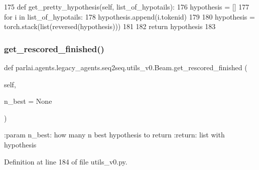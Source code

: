 \begin{DoxyCode}
175     \textcolor{keyword}{def }get\_pretty\_hypothesis(self, list\_of\_hypotails):
176         hypothesis = []
177         \textcolor{keywordflow}{for} i \textcolor{keywordflow}{in} list\_of\_hypotails:
178             hypothesis.append(i.tokenid)
179 
180         hypothesis = torch.stack(list(reversed(hypothesis)))
181 
182         \textcolor{keywordflow}{return} hypothesis
183 
\end{DoxyCode}
\mbox{\label{classparlai_1_1agents_1_1legacy__agents_1_1seq2seq_1_1utils__v0_1_1Beam_a3c573eb1104002cb7da1483a6afb3cfe}} 
\subsubsection{\texorpdfstring{get\+\_\+rescored\+\_\+finished()}{get\_rescored\_finished()}}
{\footnotesize\ttfamily def parlai.\+agents.\+legacy\+\_\+agents.\+seq2seq.\+utils\+\_\+v0.\+Beam.\+get\+\_\+rescored\+\_\+finished (\begin{DoxyParamCaption}\item[{}]{self,  }\item[{}]{n\+\_\+best = {\ttfamily None} }\end{DoxyParamCaption})}

\begin{DoxyVerb}:param n_best: how many n best hypothesis to return
:return: list with hypothesis
\end{DoxyVerb}
 

Definition at line 184 of file utils\+\_\+v0.\+py.


